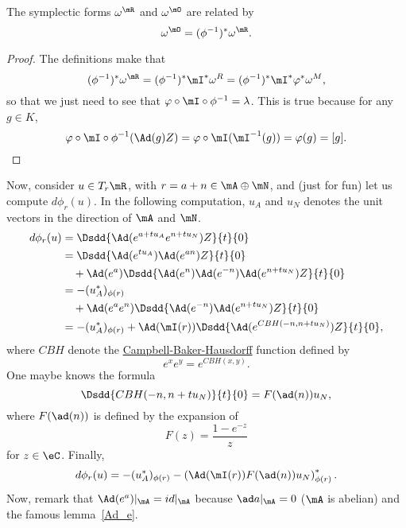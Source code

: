 \begin{lemma}\label{lem:om_O_om_R}
	The symplectic forms $\omega^{\mR}$ and $\omega^{\mO}$ are related by
	\begin{equation}
		\omega^{\mO}=(\phi^{-1})^*\omega^{\mR}.
	\end{equation}
\end{lemma}

\begin{proof}
	The definitions make that
	\begin{equation}
		(\phi^{-1})^*\omega^{\mR}=(\phi^{-1})^*\mI^*\omega^R
		=(\phi^{-1})^*\mI^*\varphi^*\omega^M,
	\end{equation}
	so that we just need to see that $\varphi\circ\mI\circ\phi^{-1}=\lambda$. This is true because for any $g\in K$,
	\[
		\varphi\circ\mI\circ\phi^{-1}(\Ad(g)Z)=\varphi\circ\mI(\mI^{-1}(g))=\varphi(g)=[g].
	\]

\end{proof}

Now, consider $u\in T_r\mR$, with $r=a+n\in\mA\oplus\mN$, and (just for fun) let us compute $d\phi_r(u)$. In the following computation, $u_A$ and $u_N$ denotes the unit vectors in the direction of $\mA$ and $\mN$.
\begin{equation}
	\begin{split}
		d\phi_r(u)&=\Dsdd{  \Ad(e^{a+tu_A}e^{n+tu_N})Z  }{t}{0}\\
		&=\Dsdd{ \Ad(e^{tu_A})\Ad(e^{an})Z  }{t}{0}\\
		&\quad+\Ad(e^a)\Dsdd{  \Ad(e^n)\Ad(e^{-n})\Ad(e^{n+tu_N})Z  }{t}{0}\\
		&=-(u_A^*)_{\phi(r)}\\
		&\quad+\Ad(e^ae^n)\Dsdd{ \Ad(e^{-n})\Ad( e^{n+tu_N} )Z  }{t}{0}\\
		&=-(u_A^*)_{\phi(r)}+\Ad(\mI(r))\Dsdd{  \Ad(e^{ CBH(-n,n+tu_N) })Z  }{t}{0},
	\end{split}
\end{equation}
where $CBH$ denote the \href{http://en.wikipedia.org/wiki/Baker-Campbell-Hausdorff_formula}{Campbell-Baker-Hausdorff} function defined by
\[
	e^xe^y=e^{CBH(x,y)}.
\]
One maybe knows the formula
\begin{equation}
	\Dsdd{  CBH(-n,n+tu_N)  }{t}{0}=F(\ad(n))u_N,
\end{equation}
where $F(\ad(n))$ is defined by the expansion of
\[
	F(z)=\frac{1-e^{-z}}{z}
\]
for $z\in\eC$. Finally,
\begin{equation}
	d\phi_r(u)=-(u_A^*)_{\phi(r)}-\left(  \Ad(\mI(r))F(\ad(n))u_N  \right)^*_{\phi(r)}.
\end{equation}
Now, remark that $\Ad(e^a)|_{\mA}=id|_{\mA}$ because $\ad a|_{\mA}=0$ ($\mA$ is abelian) and
the famous lemma~\ref{Ad_e}.

